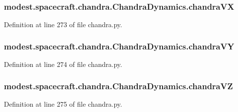 \subsubsection[{\texorpdfstring{chandra\+VX}{chandraVX}}]{\setlength{\rightskip}{0pt plus 5cm}modest.\+spacecraft.\+chandra.\+Chandra\+Dynamics.\+chandra\+VX}\hypertarget{classmodest_1_1spacecraft_1_1chandra_1_1ChandraDynamics_a8b3e4821c06a3f3aafb00f55a0549643}{}\label{classmodest_1_1spacecraft_1_1chandra_1_1ChandraDynamics_a8b3e4821c06a3f3aafb00f55a0549643}


Definition at line 273 of file chandra.\+py.

\subsubsection[{\texorpdfstring{chandra\+VY}{chandraVY}}]{\setlength{\rightskip}{0pt plus 5cm}modest.\+spacecraft.\+chandra.\+Chandra\+Dynamics.\+chandra\+VY}\hypertarget{classmodest_1_1spacecraft_1_1chandra_1_1ChandraDynamics_ad2b22d98a8c144df6fbfe65a9c02a90f}{}\label{classmodest_1_1spacecraft_1_1chandra_1_1ChandraDynamics_ad2b22d98a8c144df6fbfe65a9c02a90f}


Definition at line 274 of file chandra.\+py.

\subsubsection[{\texorpdfstring{chandra\+VZ}{chandraVZ}}]{\setlength{\rightskip}{0pt plus 5cm}modest.\+spacecraft.\+chandra.\+Chandra\+Dynamics.\+chandra\+VZ}\hypertarget{classmodest_1_1spacecraft_1_1chandra_1_1ChandraDynamics_a716ee8b96a2e1346ae371426fe373a2d}{}\label{classmodest_1_1spacecraft_1_1chandra_1_1ChandraDynamics_a716ee8b96a2e1346ae371426fe373a2d}


Definition at line 275 of file chandra.\+py.

